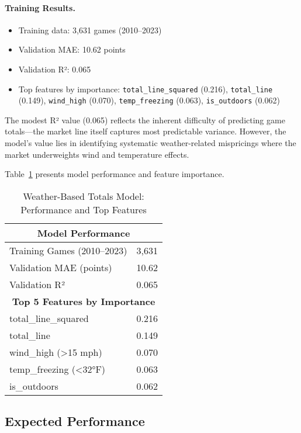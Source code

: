 \paragraph{Training Results.}
\begin{itemize}
  \item Training data: 3,631 games (2010--2023)
  \item Validation MAE: 10.62 points
  \item Validation R²: 0.065
  \item Top features by importance: \texttt{total\_line\_squared} (0.216), \texttt{total\_line} (0.149), \texttt{wind\_high} (0.070), \texttt{temp\_freezing} (0.063), \texttt{is\_outdoors} (0.062)
\end{itemize}

The modest R² value (0.065) reflects the inherent difficulty of predicting game totals---the market line itself captures most predictable variance. However, the model's value lies in identifying systematic weather-related mispricings where the market underweights wind and temperature effects.

Table~\ref{tab:weather-totals-performance} presents model performance and feature importance.

\begin{table}[htbp]
\centering
\caption{Weather-Based Totals Model: Performance and Top Features}
\label{tab:weather-totals-performance}
\begin{tabular}{@{} l r @{}}
\toprule
\multicolumn{2}{c}{\textbf{Model Performance}} \\
\midrule
Training Games (2010--2023) & 3,631 \\
Validation MAE (points) & 10.62 \\
Validation R² & 0.065 \\
\midrule
\multicolumn{2}{c}{\textbf{Top 5 Features by Importance}} \\
\midrule
total\_line\_squared & 0.216 \\
total\_line & 0.149 \\
wind\_high (>15 mph) & 0.070 \\
temp\_freezing (<32°F) & 0.063 \\
is\_outdoors & 0.062 \\
\bottomrule
\end{tabular}
\end{table}

\subsection{Expected Performance}

